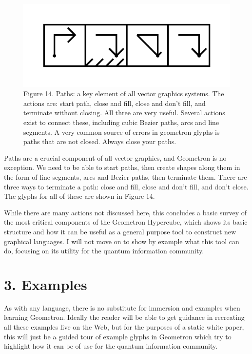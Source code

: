 \documentclass[11pt]{article}
\begin{document}
\begin{figure}

\includegraphics[width=\linewidth]{figures/figure14_paths.png}

\caption{Figure 14. Paths: a key element of all vector graphics systems.  The actions are: start path, close and fill, close and don't fill, and terminate without closing.  All three are very useful.  Several actions exist to connect these, including cubic Bezier paths, arcs and line segments.  A very common source of errors in geometron glyphs is paths that are not closed.  Always close your paths. }
\end{figure}




    Paths are a crucial component of all vector graphics, and Geometron is no exception.  We need to be able to start paths, then create shapes along them in the form of line segments, arcs and Bezier paths, then terminate them.  There are three ways to terminate a path: close and fill, close and don't fill, and don't close.  The glyphs for all of these are shown in Figure 14.  




    While there are many actions not discussed here, this concludes a basic survey of the most critical components of the Geometron Hypercube, which shows its basic structure and how it can be useful as a general purpose tool to construct new graphical languages.  I will not move on to show by example what this tool can do, focusing on its utility for the quantum information community.




\section{
3. Examples}





    As with any language, there is no substitute for immersion and examples when learning Geometron.  Ideally the reader will be able to get guidance in recreating all these examples live on the Web, but for the purposes of a static white paper, this will just be a guided tour of example glyphs in Geometron which try to highlight how it can be of use for the quantum information community.
\end{document}
